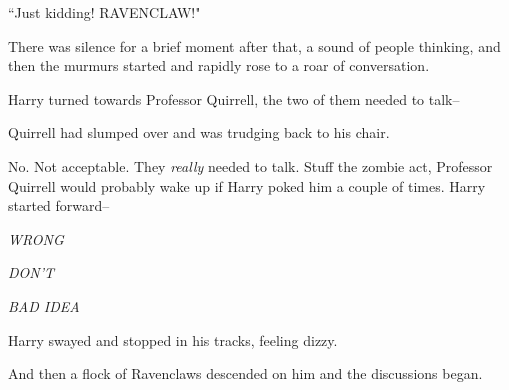 ``Just kidding! RAVENCLAW!"

There was silence for a brief moment after that, a sound of people thinking, and then the murmurs started and rapidly rose to a roar of conversation.

Harry turned towards Professor Quirrell, the two of them needed to talk\---

Quirrell had slumped over and was trudging back to his chair.

No. Not acceptable. They \emph{really} needed to talk. Stuff the zombie act, Professor Quirrell would probably wake up if Harry poked him a couple of times. Harry started forward\---

\emph{WRONG}

\emph{DON'T}

\emph{BAD IDEA}

Harry swayed and stopped in his tracks, feeling dizzy.

And then a flock of Ravenclaws descended on him and the discussions began.

